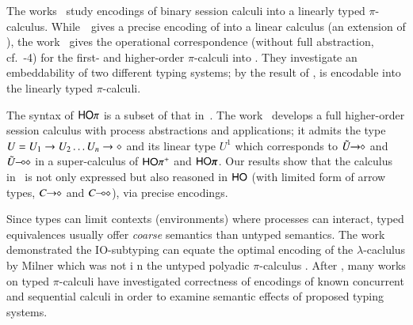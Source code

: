 
The works~\cite{DemangeonH11,Dardha:2012:STR:2370776.2370794} 
study encodings of binary session calculi into a linearly typed $\pi$-calculus. 
While~\cite{DemangeonH11}~gives a precise encoding of \sessp into a linear calculus 
(an extension of \cite{BHY}),  
the work~\cite{Dardha:2012:STR:2370776.2370794} 
gives the operational correspondence 
(without full abstraction, cf.~-4)
for the first- and higher-order 
$\pi$-calculi into \cite{LinearPi}. 
They investigate an embeddability of two different typing systems;
by the result of \cite{DemangeonH11}, 
\HOpp is encodable  into the linearly typed $\pi$-calculi.     

The syntax of $\mathsf{HO}\pi$ is a subset of that in~\cite{tlca07,MostrousY15}.
The work~\cite{tlca07} develops a full higher-order session calculus
with process abstractions and applications; it admits the type 
$U=U_1 \rightarrow U_2 \dots U_n \rightarrow \diamond$ and its linear type 
$U^1$
which corresponds to $\tilde{U}\!\! \rightarrow\!\! \diamond$ and $\tilde{U}\!\! \multimap\!\! \diamond$ in 
a super-calculus of $\mathsf{HO}\pi^{\mathsf +}$ and $\PHOp$. 
Our results show that
the calculus in~\cite{tlca07} is not only expressed but 
also reasoned in 
$\mathsf{HO}$ (with limited form of arrow types, $C\!\! \rightarrow\!\! \diamond$ and $C\!\! \multimap\!\! \diamond$), via precise encodings.   



Since types can limit
contexts (environments) where processes can interact, typed equivalences
usually offer {\em coarse} semantics than untyped semantics. 
The work  \cite{PiSa96b} demonstrated the IO-subtyping can equate 
the optimal encoding of the $\lambda$-caclulus by Milner which was not i
n the untyped polyadic $\pi$-calculus \cite{MilnerR:funp}. 
After \cite{PiSa96b}, many works on typed $\pi$-calculi 
have investigated correctness of encodings of known concurrent and
sequential calculi in order to examine semantic
effects of proposed typing systems. 

